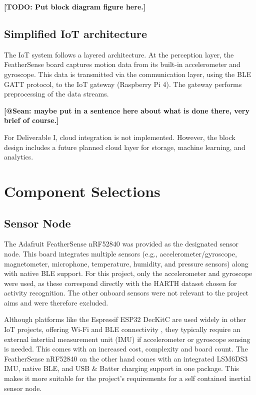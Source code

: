 \documentclass[conference]{IEEEtran}
\begin{document}
\textbf{[TODO: Put block diagram figure here.]} 

\subsection{Simplified IoT architecture}

The IoT system follows a layered architecture. At the perception layer, the FeatherSense board captures motion data from its built-in accelerometer and gyroscope. This data is transmitted via the communication layer, using the BLE GATT protocol, to the IoT gateway (Raspberry Pi 4). The gateway performs preprocessing of the data streams. 

\textbf{[@Sean: maybe put in a sentence here about what is done there, very brief of course.]} 

For Deliverable I, cloud integration is not implemented. However, the block design includes a future planned cloud layer for storage, machine learning, and analytics.



\section{Component Selections}\label{CS}

\subsection{Sensor Node}\label{SN}
The Adafruit FeatherSense nRF52840\cite{b7} was provided as the designated sensor node. This board integrates multiple sensors (e.g., accelerometer/gyroscope, magnetometer, microphone, temperature, humidity, and pressure sensors) along with native BLE support. For this project, only the accelerometer and gyroscope were used, as these correspond directly with the HARTH dataset \cite{b5,b6} chosen for activity recognition. The other onboard sensors were not relevant to the project aims and were therefore excluded.

Although platforms like the Espressif ESP32 DecKitC are used widely in other IoT projects, offering Wi-Fi and BLE connectivity \cite{b8}, they typically require an external intertial measurement unit (IMU) if accelerometer or gyroscope sensing is needed. This comes with an increased cost, complexity and board count. The FeatherSense nRF52840 on the other hand comes with an integrated LSM6DS3 IMU, native BLE, and USB \& Batter charging support in one package. This makes it more suitable for the project's requirements for a self contained inertial sensor node.
\end{document}
